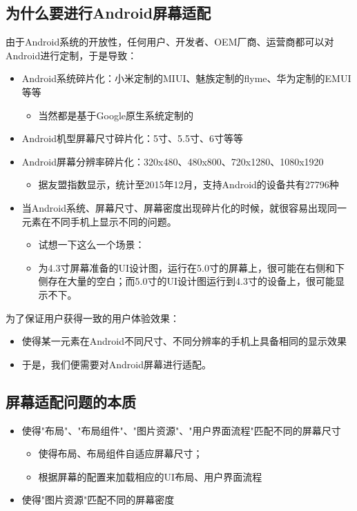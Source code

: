 \documentclass[9pt, b5paper]{article}
\begin{document}
\subsection{为什么要进行Android屏幕适配}
\label{sec-6-5}

由于Android系统的开放性，任何用户、开发者、OEM厂商、运营商都可以对Android进行定制，于是导致：
\begin{itemize}
\item Android系统碎片化：小米定制的MIUI、魅族定制的flyme、华为定制的EMUI等等
\begin{itemize}
\item 当然都是基于Google原生系统定制的
\end{itemize}
\item Android机型屏幕尺寸碎片化：5寸、5.5寸、6寸等等
\item Android屏幕分辨率碎片化：320x480、480x800、720x1280、1080x1920
\begin{itemize}
\item 据友盟指数显示，统计至2015年12月，支持Android的设备共有27796种
\end{itemize}
\item 当Android系统、屏幕尺寸、屏幕密度出现碎片化的时候，就很容易出现同一元素在不同手机上显示不同的问题。
\begin{itemize}
\item 试想一下这么一个场景：
\item 为4.3寸屏幕准备的UI设计图，运行在5.0寸的屏幕上，很可能在右侧和下侧存在大量的空白；而5.0寸的UI设计图运行到4.3寸的设备上，很可能显示不下。
\end{itemize}
\end{itemize}

为了保证用户获得一致的用户体验效果：
\begin{itemize}
\item 使得某一元素在Android不同尺寸、不同分辨率的手机上具备相同的显示效果
\item 于是，我们便需要对Android屏幕进行适配。
\end{itemize}

\subsection{屏幕适配问题的本质}
\label{sec-6-6}
\begin{itemize}
\item 使得"布局"、"布局组件"、"图片资源"、"用户界面流程"匹配不同的屏幕尺寸
\begin{itemize}
\item 使得布局、布局组件自适应屏幕尺寸；
\item 根据屏幕的配置来加载相应的UI布局、用户界面流程
\end{itemize}
\item 使得"图片资源"匹配不同的屏幕密度
\end{itemize}
\end{document}
